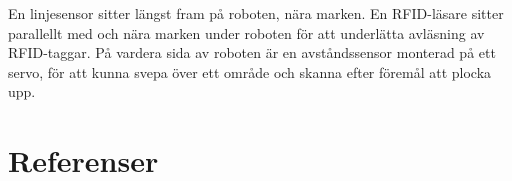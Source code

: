 \documentclass[a4paper,12pt]{article}
\begin{document}
En linjesensor sitter längst fram på roboten, nära marken. En RFID-läsare sitter parallellt med och nära marken under roboten för att underlätta avläsning av RFID-taggar. På vardera sida av roboten är en avståndssensor monterad på ett servo, för att kunna svepa över ett område och skanna efter föremål att plocka upp.








\newpage
\section*{Referenser}


\newpage
\appendix

\end{document}
